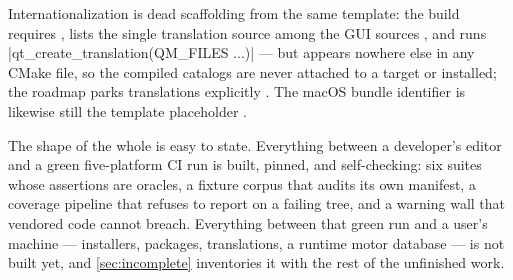 Internationalization is dead scaffolding from the same template: the build requires
 , lists the single translation source
  among the GUI sources
, and runs \cppinline|qt_create_translation(QM_FILES ...)|
 --- but  appears nowhere else in any CMake
file, so the compiled catalogs are never attached to a target or installed; the roadmap
parks translations explicitly . The macOS bundle identifier is likewise
still the template placeholder  .

The shape of the whole is easy to state. Everything between a developer's editor and a
green five-platform CI run is built, pinned, and self-checking: six suites whose
assertions are oracles, a fixture corpus that audits its own manifest, a coverage
pipeline that refuses to report on a failing tree, and a warning wall that vendored code
cannot breach. Everything between that green run and a user's machine --- installers,
packages, translations, a runtime motor database --- is not built yet, and
\cref{sec:incomplete} inventories it with the rest of the unfinished work.

